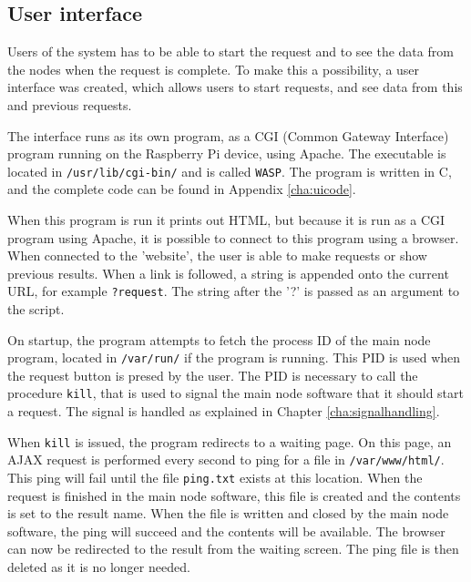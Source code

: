 \subsection{User interface} \label{cha:webinterface}
Users of the system has to be able to start the request and to see the data from the nodes when the request is complete. To make this a possibility, a user interface was created, which allows users to start requests, and see data from this and previous requests.

The interface runs as its own program, as a CGI (Common Gateway Interface) program running on the Raspberry Pi device, using Apache. The executable is located in \texttt{/usr/lib/cgi-bin/} and is called \texttt{WASP}. The program is written in C, and the complete code can be found in Appendix \ref{cha:uicode}.

When this program is run it prints out HTML, but because it is run as a CGI program using Apache, it is possible to connect to this program using a browser. When connected to the 'website', the user is able to make requests or show previous results. When a link is followed, a string is appended onto the current URL, for example \texttt{?request}. The string after the '?' is passed as an argument to the script.

On startup, the program attempts to fetch the process ID of the main node program, located in \texttt{/var/run/} if the program is running. This PID is used when the request button is presed by the user. The PID is necessary to call the procedure \texttt{kill}, that is used to signal the main node software that it should start a request. The signal is handled as explained in Chapter \ref{cha:signalhandling}.

When \texttt{kill} is issued, the program redirects to a waiting page. On this page, an AJAX request is performed every second to ping for a file in \texttt{/var/www/html/}. This ping will fail until the file \texttt{ping.txt} exists at this location. When the request is finished in the main node software, this file is created and the contents is set to the result name. When the file is written and closed by the main node software, the ping will succeed and the contents will be available. The browser can now be redirected to the result from the waiting screen. The ping file is then deleted as it is no longer needed.